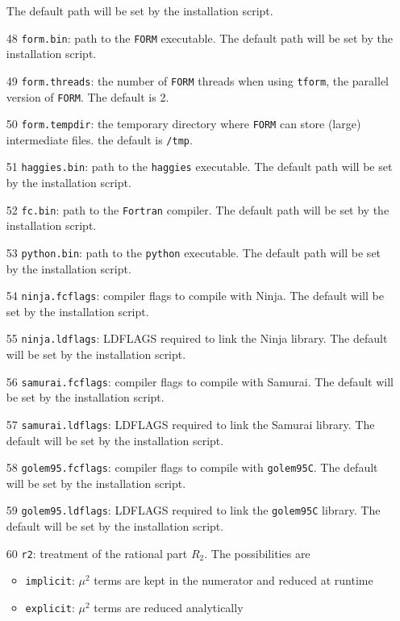 \documentclass[11pt,a4paper]{refrep}
\newcommand{\golemVC}{{\tt golem95C}\xspace}
\newcommand{\form}{{\tt FORM}\xspace}
\newcommand{\samurai}{{\sc Samurai}\xspace}
\newcommand{\ninja}{{\sc Ninja}\xspace}
\begin{document}
\begin{enumerate}
The default path will be set by the installation script.
\item[48] \texttt{form.bin}:  path to the \form{} executable.  
The default path will be set by the installation script.
\item[49] \texttt{form.threads}: the number of \form{} threads when using {\tt tform}, 
the parallel version of \form.  The default is 2.
\item[50] \texttt{form.tempdir}: the temporary directory where \form{} 
can store (large) intermediate files.  the default is {\tt /tmp}.
\item[51] \texttt{haggies.bin}: path to the {\tt haggies} executable.
The default path will be set by the installation script.
\item[52] \texttt{fc.bin}: path to the {\tt Fortran} compiler. 
The default path will be set by the installation script.
\item[53] \texttt{python.bin}:  path to the {\tt python} executable. 
The default path will be set by the installation script.
\item[54] \texttt{ninja.fcflags}: compiler flags to compile with \ninja. 
The default will be set by the installation script.
\item[55] \texttt{ninja.ldflags}: LDFLAGS required to link the \ninja{} library.    
The default will be set by the installation script.
\item[56] \texttt{samurai.fcflags}:  compiler flags to compile with \samurai. 
The default will be set by the installation script.
\item[57] \texttt{samurai.ldflags}: LDFLAGS required to link the \samurai{} library.    
The default will be set by the installation script. 
\item[58] \texttt{golem95.fcflags}: compiler flags to compile with \golemVC{}. 
The default will be set by the installation script. 
\item[59] \texttt{golem95.ldflags}:  LDFLAGS required to link the \golemVC{} library.    
The default will be set by the installation script. 
\item[60] \texttt{r2}: treatment of the rational part $R_2$. The possibilities are
\begin{itemize}
\item {\tt implicit}: $\mu^2$ terms are kept in the numerator and reduced at runtime
\item {\tt explicit}: $\mu^2$ terms are reduced analytically 

\end{itemize}
\end{enumerate}
\end{document}
